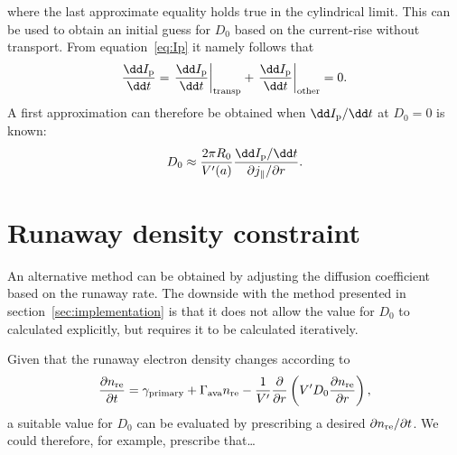 \documentclass{notes}
\begin{document}
	where the last approximate equality holds true in the cylindrical limit.
	This can be used to obtain an initial guess for $D_0$ based on the
	current-rise without transport. From equation~\eqref{eq:Ip} it namely
	follows that
	\begin{equation}\label{eq:dIdt}
		\frac{\dd I_{\rm p}}{\dd t} =
			\left.\frac{\dd I_{\rm p}}{\dd t}\right|_{\rm transp} +
			\left.\frac{\dd I_{\rm p}}{\dd t}\right|_{\rm other}
			= 0.
	\end{equation}
	A first approximation can therefore be obtained when $\dd I_{\rm p}/\dd t$
	at $D_0=0$ is known:
	\begin{equation}\label{eq:D0app}
		D_0\approx \frac{2\pi R_0}{V'(a)}
			\frac{\dd I_{\rm p} / \dd t}
			{\partial j_\parallel/\partial r}.
	\end{equation}

	\section{Runaway density constraint}
	An alternative method can be obtained by adjusting the diffusion coefficient
	based on the runaway rate. The downside with the method presented in
	section~\ref{sec:implementation} is that it does not allow the value for
	$D_0$ to calculated explicitly, but requires it to be calculated
	iteratively.

	Given that the runaway electron density changes according to
	\begin{equation}
		\frac{\partial n_{\rm re}}{\partial t} =
			\gamma_{\rm primary} + \Gamma_{\rm ava}n_{\rm re} -
			\frac{1}{V'}\frac{\partial}{\partial r}\left(
				V' D_0 \frac{\partial n_{\rm re}}{\partial r}
			\right),
	\end{equation}
	a suitable value for $D_0$ can be evaluated by prescribing a desired
	$\partial n_{\rm re}/\partial t$. We could therefore, for example, prescribe
	that\ldots
\end{document}
